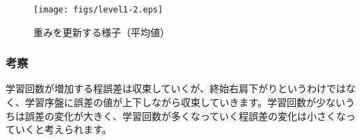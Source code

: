 \begin{figure}[h]
 \begin{center}
  \texttt{[image: figs/level1-2.eps]}
  \caption{重みを更新する様子（平均値）}
  \label{fig:level1-2}
 \end{center}
\end{figure}


\subsubsection{考察}
学習回数が増加する程誤差は収束していくが、終始右肩下がりというわけではなく、学習序盤に誤差の値が上下しながら収束していきます。学習回数が少ないうちは誤差の変化が大きく、学習回数が多くなっていく程誤差の変化は小さくなっていくと考えられます。


